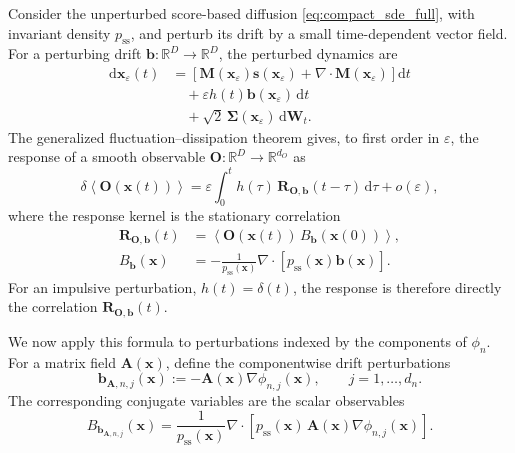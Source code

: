 \documentclass[11pt,twoside,fleqn]{article}
\renewcommand{\d}{\mathrm{d}}
\begin{document}
Consider the unperturbed score-based diffusion \eqref{eq:compact_sde_full},
with invariant density \(p_{\mathrm{ss}}\), and perturb its drift by a small
time-dependent vector field. For a perturbing drift
\(\bm{b}:\mathbb{R}^D\to\mathbb{R}^D\), the perturbed dynamics are
\begin{align}
    \d\bm{x}_\varepsilon(t)
    &=
    \left[
        \bm{M}(\bm{x}_\varepsilon)\bm{s}(\bm{x}_\varepsilon)
        +
        \nabla\cdot\bm{M}(\bm{x}_\varepsilon)
    \right]\d t
    \nonumber
    \\
    &\quad+
    \varepsilon h(t)\bm{b}(\bm{x}_\varepsilon)\,\d t
    \nonumber
    \\
    &\quad+
    \sqrt{2}\,\bm{\Sigma}(\bm{x}_\varepsilon)\,\d\bm{W}_t .
    \label{eq:gfdt_perturbed_sde}
\end{align}
The generalized fluctuation--dissipation theorem gives, to first order in
\(\varepsilon\), the response of a smooth observable
\(\bm{O}:\mathbb{R}^D\to\mathbb{R}^{d_O}\) as
\cite{Agarwal1972,FalcioniIsolaVulpiani1990,MarconiPuglisiRondoniVulpiani2008,Lucarini2008}
\begin{equation}
    \delta\left\langle \bm{O}(\bm{x}(t))\right\rangle
    =
    \varepsilon
    \int_0^t
        h(\tau)\,
        \bm{R}_{\bm{O},\bm{b}}(t-\tau)\,
    \d\tau
    +
    o(\varepsilon),
    \label{eq:gfdt_convolution_response}
\end{equation}
where the response kernel is the stationary correlation
\begin{align}
    \bm{R}_{\bm{O},\bm{b}}(t)
    &=
    \left\langle
        \bm{O}(\bm{x}(t))\,
        B_{\bm{b}}(\bm{x}(0))
    \right\rangle ,
    \\
    B_{\bm{b}}(\bm{x})
    &=-
    \frac{1}{p_{\mathrm{ss}}(\bm{x})}
    \nabla\cdot
    \left[
        p_{\mathrm{ss}}(\bm{x})\bm{b}(\bm{x})
    \right].
    \label{eq:gfdt_conjugate_variable_vector}
\end{align}
For an impulsive perturbation, \(h(t)=\delta(t)\), the response is therefore
directly the correlation
\(\bm{R}_{\bm{O},\bm{b}}(t)\).

We now apply this formula to perturbations indexed by the components of
\(\phi_n\). For a matrix field \(\bm{A}(\bm{x})\), define the componentwise
drift perturbations
\begin{equation}
    \bm{b}_{\bm{A},n,j}(\bm{x})
    :=
    -
    \bm{A}(\bm{x})\nabla\phi_{n,j}(\bm{x}),
    \qquad
    j=1,\dots,d_n .
    \label{eq:b_A_n_j_definition}
\end{equation}
The corresponding conjugate variables are the scalar observables
\begin{equation}
    B_{\bm{b}_{\bm{A},n,j}}(\bm{x})
    =
    \frac{1}{p_{\mathrm{ss}}(\bm{x})}
    \nabla\cdot
    \left[
        p_{\mathrm{ss}}(\bm{x})\,
        \bm{A}(\bm{x})\nabla\phi_{n,j}(\bm{x})
    \right].
    \label{eq:B_b_A_n_j_definition}
\end{equation}
\end{document}
